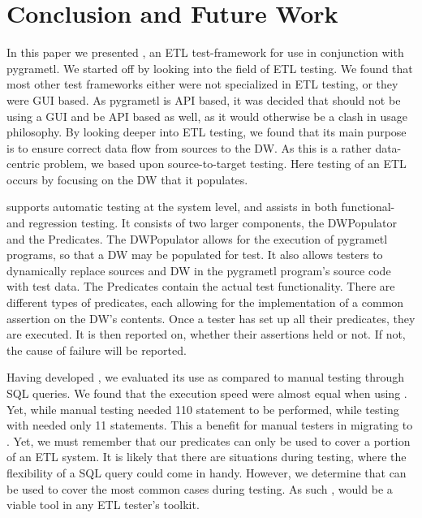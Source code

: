 \section{Conclusion and Future Work}\label{sect:conc}

In this paper we presented \FW{}, an ETL test-framework for use in conjunction with pygrametl. We started off by looking into the field of ETL testing. We found that most other test frameworks either were not specialized in ETL testing, or they were GUI based. As pygrametl is API based, it was decided that \FW{} should not be using a GUI and be API based as well, as it would otherwise be a clash in usage philosophy. By looking deeper into ETL testing, we found that its main purpose is to ensure correct data flow from sources to the DW. As this is a rather data-centric problem, we based \FW{} upon source-to-target testing. Here testing of an ETL occurs by focusing on the DW that it populates.

\FW{} supports automatic testing at the system level, and assists in both functional- and regression testing. It consists of two larger components, the DWPopulator and the Predicates. The DWPopulator allows for the execution of pygrametl programs, so that a DW may be populated for test. It also allows testers to dynamically replace sources and DW in the pygrametl program’s source code with test data. The Predicates contain the actual test functionality. There are different types of predicates, each allowing for the implementation of a common assertion on the DW’s contents. Once a tester has set up all their predicates, they are executed. It is then reported on, whether their assertions held or not. If not, the cause of failure will be reported.

Having developed \FW{}, we evaluated its use as compared to manual testing through SQL queries. We found that the  execution speed were almost equal when using \FW{}. Yet, while manual testing needed 110 statement to be performed, while testing with \FW{} needed only 11 statements. This a benefit for manual testers in migrating to \FW{}. Yet, we must remember that our predicates can only be used to cover a portion of an ETL system. It is likely that there are situations during testing, where the flexibility of a SQL query could come in handy. However, we determine that \FW{} can be used to cover the most common cases during testing. As such \FW{}, would be a viable tool in any ETL tester’s toolkit.

